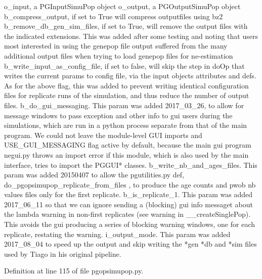 \begin{DoxyVerb}    o_input, a PGInputSimuPop object
    o_output, a PGOutputSimuPop object
    b_compress_output, if set to True
will compress outputfiles using bz2
    b_remove_db_gen_sim_files, if set to True,
will remove the output files with the
indicated extensions.  This was added
after some testing and noting that
users most interested in using the genepop
file output suffered from the many additional
output files when trying to load genepop files
for ne-estimation
    b_write_input_as_config_file, if set to false, will 
skip the step in doOp that writes the current params
to config file, via the input objects attributes 
and defs. As for the above flag, this was added
to prevent writing identical configuration files
for replicate runs of the simulation, and thus
reduce the number of output files. 
    b_do_gui_messaging.  This param was added 2017_03_26,
to allow for message windows to pass exception and
other info to gui users during the simulations,
which are run in a python process separate from 
that of the main program.  We could not leave the
module-level GUI imports and USE_GUI_MESSAGING
flag active by default, because the main gui 
program negui.py throws an import error if this module,
which is also used by the main interface,
tries to import the PGGUI* classes.  
    b_write_nb_and_ages_files.  This param was added 20150407
to allow the pgutilities.py def, 
do_pgopsimupop_replicate_from_files , to produce
the age counts and pwob nb values files only for
the first replicate.
    b_is_replicate_1.  This param was added 2017_06_11 so that
we can ignore sending a (blocking) gui info messaget
about the lambda warning in non-first
replicates (see warning in __createSinglePop).  This avoids
the gui producing a series of blocking warning windows, one
for each replicate, restating the warning.
    i_output_mode.  This param was added 2017_08_04 to speed up
the output and skip writing the *gen *db and *sim files used
by Tiago in his original pipeline.  \end{DoxyVerb}
 

Definition at line 115 of file pgopsimupop.\+py.


